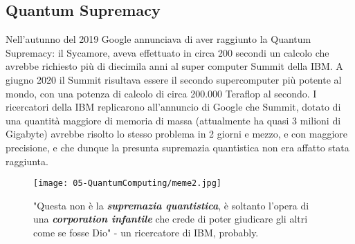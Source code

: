 
\subsection{Quantum Supremacy}

Nell’autunno del 2019 Google annunciava di aver raggiunto la
Quantum Supremacy: il Sycamore, aveva effettuato in circa 200
secondi un calcolo che avrebbe richiesto più di diecimila anni al
super computer Summit della IBM. A giugno 2020 il Summit risultava essere il secondo supercomputer
più potente al mondo, con una potenza di calcolo di circa 200.000
Teraflop al secondo. I ricercatori della IBM replicarono all’annuncio
di Google che Summit, dotato di una quantità maggiore di memoria di
massa (attualmente ha quasi 3 milioni di Gigabyte) avrebbe risolto lo
stesso problema in 2 giorni e mezzo, e con maggiore precisione, e che
dunque la presunta supremazia quantistica non era affatto stata
raggiunta.

\begin{figure}[!h]
    \centering
    \texttt{[image: 05-QuantumComputing/meme2.jpg]}
    \caption{"Questa non è la \textbf{\textit{supremazia quantistica}}, è soltanto l'opera di una \textbf{\textit{corporation infantile}} che crede di poter giudicare gli altri come se fosse Dio" - un ricercatore di IBM, probably.}
\end{figure}
